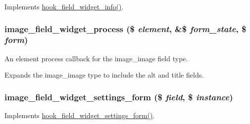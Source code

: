 \label{image_8field_8inc_a6ec5a26a8e2fcb61f177cccbe5e4e9a0}
Implements \hyperlink{group__field__widget_gac53aa6c2a4ac1215660d25b5d7f20792}{hook\_\-field\_\-widget\_\-info()}. \hypertarget{image_8field_8inc_a1d2843cf1187140d1924481f10359872}{
\subsubsection[{image\_\-field\_\-widget\_\-process}]{\setlength{\rightskip}{0pt plus 5cm}image\_\-field\_\-widget\_\-process (\$ {\em element}, \/  \&\$ {\em form\_\-state}, \/  \$ {\em form})}}
\label{image_8field_8inc_a1d2843cf1187140d1924481f10359872}
An element process callback for the image\_\-image field type.

Expands the image\_\-image type to include the alt and title fields. \hypertarget{image_8field_8inc_ab2ba9fe8f5569b05a3e8b5c28d0a62db}{
\subsubsection[{image\_\-field\_\-widget\_\-settings\_\-form}]{\setlength{\rightskip}{0pt plus 5cm}image\_\-field\_\-widget\_\-settings\_\-form (\$ {\em field}, \/  \$ {\em instance})}}
\label{image_8field_8inc_ab2ba9fe8f5569b05a3e8b5c28d0a62db}
Implements \hyperlink{group__field__types_gabe5ece2134d0cbdfc3c4793f24c5866c}{hook\_\-field\_\-widget\_\-settings\_\-form()}. 